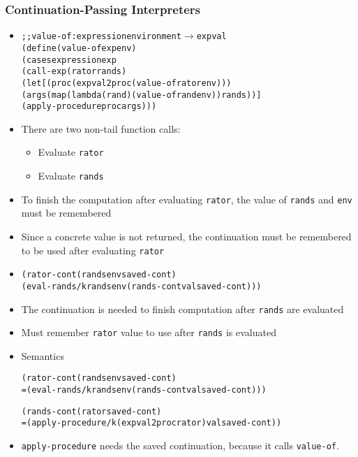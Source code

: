 \documentclass{beamer}
\newcommand{\arrow}{\(\rightarrow\)}
\begin{document}
\begin{frame}[fragile]
\frametitle{Continuation-Passing Interpreters}
\begin{scriptsize}
\begin{itemize}
\item<1->
\begin{alltt}
;; value-of : expression environment \arrow{} expval
(define (value-of exp env)
  (cases expression exp
    (call-exp (rator rands)
              (let [(proc (expval2proc (value-of rator env)))
                    (args (map (lambda (rand) (value-of rand env)) rands))]
                (apply-procedure proc args)))
\end{alltt}

\item<1-> There are two non-tail function calls:
\begin{itemize}
\item Evaluate \texttt{rator}

\item Evaluate \texttt{rands}
\end{itemize}

\item<1-> To finish the computation after evaluating \texttt{rator}, the value of \texttt{rands} and \texttt{env} must be remembered

\item<1-> Since a concrete value is not returned, the continuation must be remembered to be used after evaluating \texttt{rator}

\item<2->
\begin{alltt}
  (rator-cont (rands env saved-cont)
              (eval-rands/k rands env (rands-cont val saved-cont)))
\end{alltt}

\item<2-> The continuation is needed to finish computation after \texttt{rands} are evaluated

\item<2-> Must remember \texttt{rator} value to use after \texttt{rands} is evaluated

\item<4-> Semantics
\begin{alltt}
  (rator-cont (rands env saved-cont)
= (eval-rands/k rands env (rands-cont val saved-cont)))

  (rands-cont (rator saved-cont)
= (apply-procedure/k (expval2proc rator) val saved-cont))
\end{alltt}

\item<4-> \texttt{apply-procedure} needs the saved continuation, because it calls \texttt{value-of}.

\end{itemize}
\end{scriptsize}
\end{frame}
\end{document}
